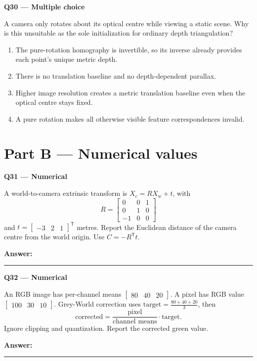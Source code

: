 \documentclass[11pt,a4paper]{article}
\begin{document}
\par\vspace{12pt}
\begin{minipage}{\linewidth}
\textbf{Q30 — Multiple choice}\par\smallskip
A camera only rotates about its optical centre while viewing a static scene. Why is this unsuitable as the sole initialization for ordinary depth triangulation?
\begin{enumerate}[label=\textbf{\Alph*.}]
\item The pure-rotation homography is invertible,\allowbreak{} so its inverse already provides each point's unique metric depth.
\item There is no translation baseline and no depth-dependent parallax.
\item Higher image resolution creates a metric translation baseline even when the optical centre stays fixed.
\item A pure rotation makes all otherwise visible feature correspondences invalid.
\end{enumerate}
\end{minipage}
\par\vspace{12pt}
\clearpage\section*{Part B — Numerical values}
\begin{minipage}{\linewidth}
\textbf{Q31 — Numerical}\par\smallskip
A world-to-camera extrinsic transform is \(X_c=R X_w+t\),\allowbreak{} with
\[R=\begin{bmatrix}0&0&1\\0&1&0\\-1&0&0\end{bmatrix}\]
 and \(t=\begin{bmatrix}-3&2&1\end{bmatrix}^{\mathsf T}\) metres. Report the Euclidean distance of the camera centre from the world origin. Use \(C=-R^{\mathsf T}t\).
\par\medskip\textbf{Answer:} \rule{55mm}{0.4pt}
\end{minipage}
\par\vspace{12pt}
\begin{minipage}{\linewidth}
\textbf{Q32 — Numerical}\par\smallskip
An RGB image has per-channel means \(\begin{bmatrix}80&40&20\end{bmatrix}\). A pixel has RGB value \(\begin{bmatrix}100&30&10\end{bmatrix}\). Grey-World correction uses \(\text{target}=\frac{80+40+20}{3}\),\allowbreak{} then
\[\text{corrected}=\frac{\text{pixel}}{\text{channel means}}\cdot\text{target}.\]
 Ignore clipping and quantization. Report the corrected green value.
\par\medskip\textbf{Answer:} \rule{55mm}{0.4pt}
\end{minipage}
\end{document}
